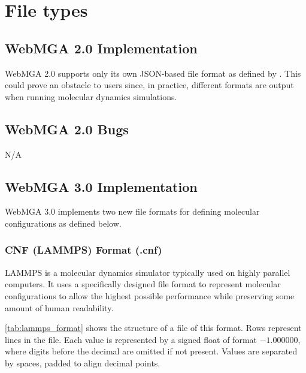 \section{File types}
\subsection{WebMGA 2.0 Implementation}
WebMGA 2.0 supports only its own JSON-based file format as defined by \citeauthor{Battistini_2021}. This could prove an obstacle to users since, in practice, different formats are output when running molecular dynamics simulations.

\subsection{WebMGA 2.0 Bugs}
N/A

\subsection{WebMGA 3.0 Implementation}
WebMGA 3.0 implements two new file formats for defining molecular configurations as defined below.
\subsubsection{CNF (LAMMPS) Format (.cnf)}
LAMMPS is a molecular dynamics simulator typically used on highly parallel computers\cite{thompson2022lammps}. It uses a specifically designed file format to represent molecular configurations to allow the highest possible performance while preserving some amount of human readability.

\cref{tab:lammps_format} shows the structure of a file of this format. Rows represent lines in the file. Each value is represented by a signed float of format $-1.000000 $, where digits before the decimal are omitted if not present. Values are separated by spaces, padded to align decimal points.

